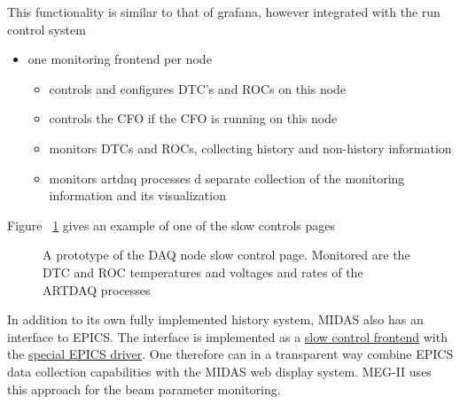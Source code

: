 This functionality is similar to that of grafana, however integrated with the
run control system

\begin{itemize}
\item
  one monitoring frontend per node 
  \begin{itemize}
  \item
    controls and configures DTC's and ROCs on this node
  \item
    controls the CFO if the CFO is running on this node
  \item
    monitors DTCs and ROCs, collecting history and non-history information
  \item
    monitors artdaq processes d separate collection of the monitoring information and its visualization
  \end{itemize}
\end{itemize}

Figure ~\ref{figure:slow_controls_node_page} gives an example of one of the slow controls pages

\begin{figure}[H]
  \caption{
    \label{figure:slow_controls_node_page}
    A prototype of the DAQ node slow control page. Monitored are the DTC and ROC temperatures and voltages
    and rates of the ARTDAQ processes
  }
\end{figure}


In addition to its own fully implemented history system, MIDAS also has an interface to EPICS.
The interface is implemented as a 
\href{https://bitbucket.org/tmidas/midas/src/develop/examples/epics/}
         {\blue slow control frontend} with the 
\href{https://bitbucket.org/tmidas/midas/src/develop/drivers/device/epics_ca.cxx}
{\blue special EPICS driver}.
%
One therefore can in a transparent way combine EPICS data collection capabilities 
with the MIDAS web display system. MEG-II uses this approach for the beam parameter monitoring.

